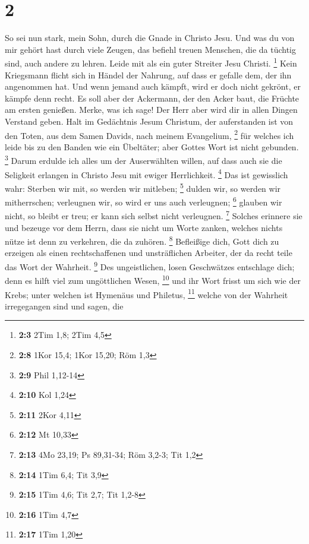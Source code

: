 \hypertarget{section-1}{%
\section{2}\label{section-1}}

 So sei nun stark, mein Sohn, durch die Gnade in Christo
Jesu.  Und was du von mir gehört hast durch viele Zeugen,
das befiehl treuen Menschen, die da tüchtig sind, auch andere zu lehren.
 Leide mit als ein guter Streiter Jesu Christi.
\footnote{\textbf{2:3} 2Tim 1,8; 2Tim 4,5}  Kein
Kriegsmann flicht sich in Händel der Nahrung, auf dass er gefalle dem,
der ihn angenommen hat.  Und wenn jemand auch kämpft, wird
er doch nicht gekrönt, er kämpfe denn recht.  Es soll aber
der Ackermann, der den Acker baut, die Früchte am ersten genießen.
Merke, was ich sage!  Der Herr aber wird dir in allen
Dingen Verstand geben.  Halt im Gedächtnis Jesum Christum,
der auferstanden ist von den Toten, aus dem Samen Davids, nach meinem
Evangelium, \footnote{\textbf{2:8} 1Kor 15,4; 1Kor 15,20; Röm 1,3}
 für welches ich leide bis zu den Banden wie ein
Übeltäter; aber Gottes Wort ist nicht gebunden. \footnote{\textbf{2:9}
  Phil 1,12-14}  Darum erdulde ich alles um der
Auserwählten willen, auf dass auch sie die Seligkeit erlangen in Christo
Jesu mit ewiger Herrlichkeit. \footnote{\textbf{2:10} Kol 1,24}
 Das ist gewisslich wahr: Sterben wir mit, so werden wir
mitleben; \footnote{\textbf{2:11} 2Kor 4,11}  dulden wir,
so werden wir mitherrschen; verleugnen wir, so wird er uns auch
verleugnen; \footnote{\textbf{2:12} Mt 10,33}  glauben
wir nicht, so bleibt er treu; er kann sich selbst nicht verleugnen.
\footnote{\textbf{2:13} 4Mo 23,19; Ps 89,31-34; Röm 3,2-3; Tit 1,2}
 Solches erinnere sie und bezeuge vor dem Herrn, dass sie
nicht um Worte zanken, welches nichts nütze ist denn zu verkehren, die
da zuhören. \footnote{\textbf{2:14} 1Tim 6,4; Tit 3,9} 
Befleißige dich, Gott dich zu erzeigen als einen rechtschaffenen und
unsträflichen Arbeiter, der da recht teile das Wort der Wahrheit.
\footnote{\textbf{2:15} 1Tim 4,6; Tit 2,7; Tit 1,2-8} 
Des ungeistlichen, losen Geschwätzes entschlage dich; denn es hilft viel
zum ungöttlichen Wesen, \footnote{\textbf{2:16} 1Tim 4,7}
 und ihr Wort frisst um sich wie der Krebs; unter welchen
ist Hymenäus und Philetus, \footnote{\textbf{2:17} 1Tim 1,20}
 welche von der Wahrheit irregegangen sind und sagen, die
